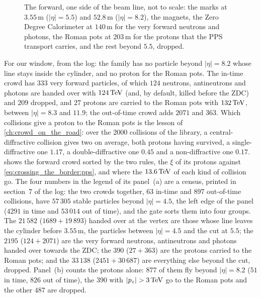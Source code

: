 \begin{figure}[htbp]\centering
\resizebox{\textwidth}{!}{}
\caption[The forward: the ZDC and the Roman pots]{The forward, one side of
the beam line, not to scale: the marks at $3.55$\,m ($|\eta|=5.5$) and
$52.8$\,m ($|\eta|=8.2$), the magnets, the Zero Degree Calorimeter at $140$\,m
for the very forward neutrons and photons, the Roman pots at $203$\,m for the
protons that the PPS transport carries, and the rest beyond $5.5$, dropped.}
\label{fig:crossing_the_border:forward}
\end{figure}

For our window, from the  log: the family has no particle beyond
$|\eta|=8.2$ whose line stays inside the cylinder, and no proton for the
Roman pots. The in-time crowd has $333$ very forward particles, of which
$124$ neutrons, antineutrons and photons are handed over with $124\,\mathrm{TeV}$
(and, by default, killed before the ZDC) and $209$ dropped, and $27$ protons are carried to the Roman pots with
$132\,\mathrm{TeV}$, between $|\eta|=8.3$ and $11.9$; the out-of-time crowd adds $2071$
and $363$. Which collisions give a proton to the Roman pots is the lesson of
\cref{ch:crowd_on_the_road}: over the $2000$ collisions of the library, a
central-diffractive collision gives two on average, both protons having
survived, a single-diffractive one $1.17$, a double-diffractive one $0.45$
and a non-diffractive one $0.17$. 
shows the forward crowd sorted by the two rules, the $\xi$ of its protons
against \cref{eq:crossing_the_border:pps}, and where the $13.6\,\mathrm{TeV}$ of each
kind of collision go. The four numbers in the legend of its panel~(a) are a
census, printed in section~7 of the log: the two crowds together, $63$
in-time and $897$ out-of-time collisions, have $57\,305$ stable particles
beyond $|\eta|=4.5$, the left edge of the panel ($4291$ in time and
$53\,014$ out of time), and the gate sorts them into four groups. The
$21\,582$ ($1689+19\,893$) handed over at the vertex are those whose line
leaves the cylinder before $3.55$\,m, the particles between $|\eta|=4.5$ and
the cut at $5.5$; the $2195$ ($124+2071$) are the very forward neutrons,
antineutrons and photons handed over towards the ZDC; the $390$ ($27+363$)
are the protons carried to the Roman pots; and the $33\,138$
($2451+30\,687$) are everything else beyond the cut, dropped. Panel~(b)
counts the protons alone: $877$ of them fly beyond $|\eta|=8.2$ ($51$ in
time, $826$ out of time), the $390$ with $|p_z|>3\TeV$ go to the Roman pots
and the other $487$ are dropped.

